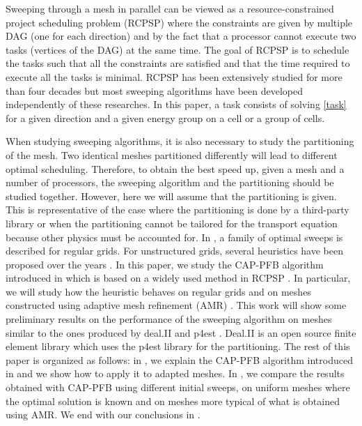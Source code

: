 \documentclass{mc2015}
\renewcommand{\(}{\left(}
\renewcommand{\)}{\right)}
\renewcommand{\[}{\left[}
\renewcommand{\]}{\right]}
\begin{document}
Sweeping through a mesh in parallel can be viewed as a resource-constrained
project scheduling problem (RCPSP) \cite{Brucker1999,Kolisch2006} where the
constraints are given by multiple DAG (one for each direction) and by the fact
that a processor cannot execute two tasks (vertices of the DAG) at the same
time. The goal of RCPSP is to schedule the tasks such that all the constraints are
satisfied and that the time required to execute all the tasks is minimal. 
RCPSP has been extensively studied for more than four decades
\cite{Pritsker1969} but most sweeping algorithms have been developed
independently of these researches. In this paper, a task consists of solving
\cref{task} for a given direction and a given energy group on a cell or a group
of cells.

When studying sweeping algorithms, it is also necessary to study the
partitioning of the mesh. Two identical meshes partitioned differently will lead
to different optimal scheduling. Therefore, to obtain the best speed up, given a
mesh and a number of processors, the sweeping algorithm and the partitioning
should be studied together. However, here we will assume that the
partitioning is given. This is representative of the case where the partitioning
is done by a third-party library or when the partitioning cannot be tailored for
the transport equation because other physics must be accounted for. In
\cite{Adams2013}, a family of optimal sweeps is described for
regular grids. For unstructured grids, several heuristics have been proposed
over the years
\cite{Pautz2002,Plimpton2005,Yan2013,Colomer2013,Kumar2005,Mo2014}. In this
paper, we study the CAP-PFB algorithm introduced in \cite{Mo2014} which is based
on a widely used method in RCPSP \cite{Li1992}. In particular, we will study how
the heuristic behaves on regular grids and on meshes constructed using adaptive
mesh refinement (AMR)
\cite{Arnold2000,Baker2002,Bangerth2007,Jessee1998,Wang2010a}. This work will
show some preliminary results on the performance of the sweeping algorithm on 
meshes similar to
the ones produced by deal.II \cite{Bangerth2007,Bangerth2013} and p4est
\cite{Burstedde2011}. Deal.II is an open source finite element library which
uses the p4est library for the partitioning. The rest of this paper is organized
as follows: in , we explain the CAP-PFB algorithm
introduced in \cite{Mo2014} and we show how to apply it to adapted meshes. In
, we compare the results obtained with CAP-PFB using different
initial sweeps, on uniform meshes where the optimal solution is known
\cite{Adams2013} and on meshes more typical of what is obtained using AMR.
We end with our conclusions in .
\end{document}
